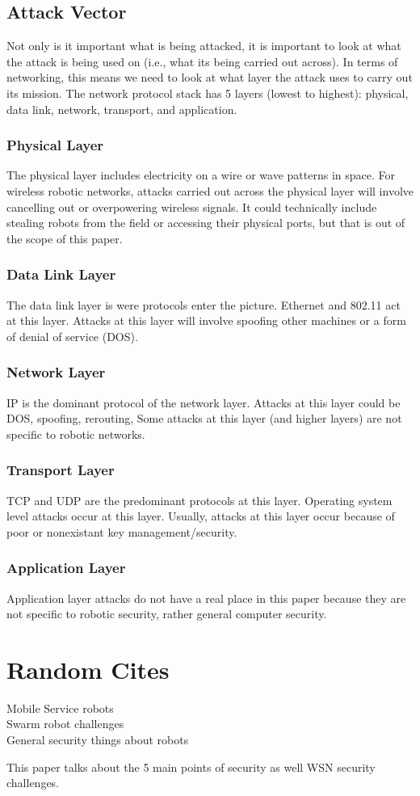 \subsection{Attack Vector}
Not only is it important what is being attacked, it is important to look at what the attack is being used on (i.e., what its being carried out across). %
In terms of networking, this means we need to look at what layer the attack uses to carry out its mission. The network protocol stack has 5 layers (lowest to highest): physical, data link, network, transport, and application. 
\\
\subsubsection{Physical Layer}
The physical layer includes electricity on a wire or wave patterns in space. For wireless robotic networks, attacks carried out across the physical layer will involve cancelling out or overpowering wireless signals. It could technically include stealing robots from the field or accessing their physical ports, but that is out of the scope of this paper.

\subsubsection{Data Link Layer}
The data link layer is were protocols enter the picture. Ethernet and 802.11 act at this layer. Attacks at this layer will involve spoofing other machines or a form of denial of service (DOS).

\subsubsection{Network Layer}
IP is the dominant protocol of the network layer. Attacks at this layer could be DOS, spoofing, rerouting, %
Some attacks at this layer (and higher layers) are not specific to robotic networks.

\subsubsection{Transport Layer}
TCP and UDP are the predominant protocols at this layer. Operating system level attacks occur at this layer. Usually, attacks at this layer occur because of poor or nonexistant key management/security.

\subsubsection{Application Layer}
Application layer attacks do not have a real place in this paper because they are not specific to robotic security, rather general computer security.

\section{Random Cites}
Mobile Service robots \cite{Cornelius}\\
Swarm robot challenges \cite{Higgins2009SurveyOS}\\
General security things about robots \cite{Yousef2018AnalyzingCT}

This paper \cite{Mostefa2017} talks about the 5 main points of security as well WSN security challenges.